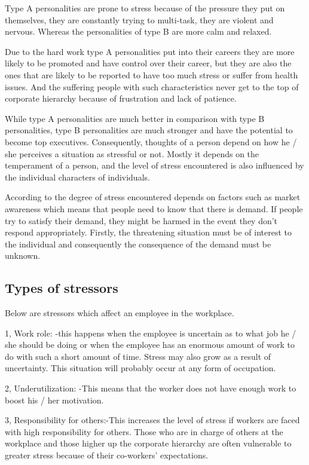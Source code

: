 Type A personalities are prone to stress because of the pressure they put on themselves, they are constantly trying to multi-task, they are violent and nervous. Whereas the personalities of type B are more calm and relaxed.

Due to the hard work type A personalities put into their careers they are more likely to be promoted and have control over their career, but they are also the ones that are likely to be reported to have too much stress or suffer from health issues. And the suffering people with such characteristics never get to the top of corporate hierarchy because of frustration and lack of patience.

While type A personalities are much better in comparison with type B personalities, type B personalities are much stronger and have the potential to become top executives. Consequently, thoughts of a person depend on how he / she perceives a situation as stressful or not.  Mostly it depends on the temperament of a person, and the level of stress encountered is also influenced by the individual characters of individuals. \citep[p.314]{Bloisi2007ManagementBehaviour}

According to \cite{LazarusR.S.Folkman1984StressCoping.} the degree of stress encountered depends on factors such as market awareness which means that people need to know that there is demand. If people try to satisfy their demand, they might be harmed in the event they don't respond appropriately. Firstly, the threatening situation must be of interest to the individual and consequently the consequence of the demand must be unknown. \citep[p.310]{Bloisi2007ManagementBehaviour}

\subsection{Types of stressors}
Below are stressors which affect an employee in the workplace. 

1, Work role: -this happens when the employee is uncertain as to what job he / she should be doing or when the employee has an enormous amount of work to do with such a short amount of time. Stress may also grow as a result of uncertainty.  This situation will probably occur at any form of occupation.

2, Underutilization: -This means that the worker does not have enough work to boost his / her motivation.

3, Responsibility for others:-This increases the level of stress if workers are faced with high responsibility for others.  Those who are in charge of others at the workplace and those higher up the corporate hierarchy are often vulnerable to greater stress because of their co-workers' expectations.

